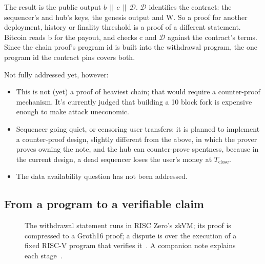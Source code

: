 \documentclass[11pt]{article}
\newcommand{\Tc}{T_{\mathrm{close}}}
\begin{document}
The result is the public output $b \,\|\, c \,\|\, \mathcal{D}$. $\mathcal{D}$ identifies the contract: the sequencer's and hub's keys, the genesis output and W. So a proof for another deployment, history or finality threshold is a proof of a different statement. Bitcoin reads b for the payout, and checks c and $\mathcal{D}$ against the contract's terms. Since the chain proof's program id is built into the withdrawal program, the one program id the contract pins covers both.

Not fully addressed yet, however:

\begin{itemize}
\item This is not (yet) a proof of heaviest chain; that would require a counter-proof mechanism. It's currently judged that building a 10 block fork is expensive enough to make attack uneconomic.
\item Sequencer going quiet, or censoring user transfers: it is planned to implement a counter-proof design, slightly different from the above, in which the prover proves owning the note, and the hub can counter-prove spentness, because in the current design, a dead sequencer loses the user's money at $\Tc$.
\item The data availability question has not been addressed.
\end{itemize}

\subsection{From a program to a verifiable claim}

\begin{figure}[H]
\centering
{}
\caption{The withdrawal statement runs in RISC Zero's zkVM; its proof is
compressed to a Groth16 proof; a dispute is over the execution of a fixed
RISC-V program that verifies it~\cite{risc0,bitvmx}. A companion note
explains each stage~\cite{pipeline}.}
\end{figure}
\end{document}

